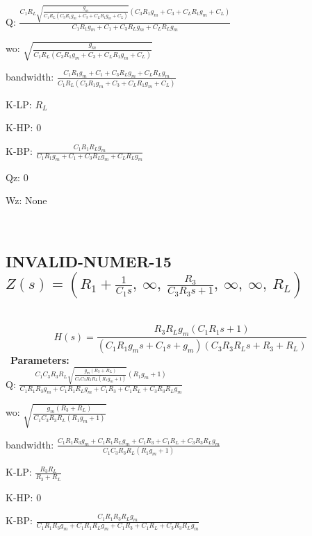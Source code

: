 \documentclass{article}
\begin{document}
Q: $\frac{C_{1} R_{L} \sqrt{\frac{g_{m}}{C_{1} R_{L} \left(C_{3} R_{1} g_{m} + C_{3} + C_{L} R_{1} g_{m} + C_{L}\right)}} \left(C_{3} R_{1} g_{m} + C_{3} + C_{L} R_{1} g_{m} + C_{L}\right)}{C_{1} R_{1} g_{m} + C_{1} + C_{3} R_{L} g_{m} + C_{L} R_{L} g_{m}}$\ 

wo: $\sqrt{\frac{g_{m}}{C_{1} R_{L} \left(C_{3} R_{1} g_{m} + C_{3} + C_{L} R_{1} g_{m} + C_{L}\right)}}$\ 

bandwidth: $\frac{C_{1} R_{1} g_{m} + C_{1} + C_{3} R_{L} g_{m} + C_{L} R_{L} g_{m}}{C_{1} R_{L} \left(C_{3} R_{1} g_{m} + C_{3} + C_{L} R_{1} g_{m} + C_{L}\right)}$\ 

K-LP: $R_{L}$\ 

K-HP: $0$\ 

K-BP: $\frac{C_{1} R_{1} R_{L} g_{m}}{C_{1} R_{1} g_{m} + C_{1} + C_{3} R_{L} g_{m} + C_{L} R_{L} g_{m}}$\ 

Qz: $0$\ 

Wz: $\text{None}$\ 

\ 

\subsection{INVALID-NUMER-15 $Z(s) = \left( R_{1} + \frac{1}{C_{1} s}, \  \infty, \  \frac{R_{3}}{C_{3} R_{3} s + 1}, \  \infty, \  \infty, \  R_{L}\right)$ } \ 
\textbf{\[H(s) = \frac{R_{3} R_{L} g_{m} \left(C_{1} R_{1} s + 1\right)}{\left(C_{1} R_{1} g_{m} s + C_{1} s + g_{m}\right) \left(C_{3} R_{3} R_{L} s + R_{3} + R_{L}\right)}\] } \ 
\textbf{Parameters:}\\ 

Q: $\frac{C_{1} C_{3} R_{3} R_{L} \sqrt{\frac{g_{m} \left(R_{3} + R_{L}\right)}{C_{1} C_{3} R_{3} R_{L} \left(R_{1} g_{m} + 1\right)}} \left(R_{1} g_{m} + 1\right)}{C_{1} R_{1} R_{3} g_{m} + C_{1} R_{1} R_{L} g_{m} + C_{1} R_{3} + C_{1} R_{L} + C_{3} R_{3} R_{L} g_{m}}$\ 

wo: $\sqrt{\frac{g_{m} \left(R_{3} + R_{L}\right)}{C_{1} C_{3} R_{3} R_{L} \left(R_{1} g_{m} + 1\right)}}$\ 

bandwidth: $\frac{C_{1} R_{1} R_{3} g_{m} + C_{1} R_{1} R_{L} g_{m} + C_{1} R_{3} + C_{1} R_{L} + C_{3} R_{3} R_{L} g_{m}}{C_{1} C_{3} R_{3} R_{L} \left(R_{1} g_{m} + 1\right)}$\ 

K-LP: $\frac{R_{3} R_{L}}{R_{3} + R_{L}}$\ 

K-HP: $0$\ 

K-BP: $\frac{C_{1} R_{1} R_{3} R_{L} g_{m}}{C_{1} R_{1} R_{3} g_{m} + C_{1} R_{1} R_{L} g_{m} + C_{1} R_{3} + C_{1} R_{L} + C_{3} R_{3} R_{L} g_{m}}$\ 
\end{document}
